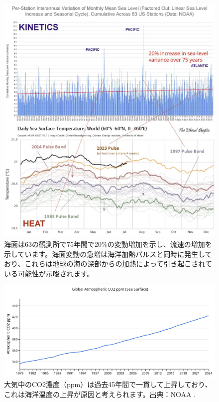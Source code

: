 \documentclass[10pt,twocolumn,letterpaper]{article}
\begin{document}
\begin{figure}[t]
\begin{center}
\includegraphics[width=1\textwidth]{sealevel.jpeg}
\end{center}
   \caption{海面は63の観測所で75年間で20\%の変動増加を示し、流速の増加を示しています。海面変動の急増は海洋加熱パルスと同時に発生しており、これらは地球の海の深部からの加熱によって引き起こされている可能性が示唆されます\cite{2,129}。}
\label{fig:22}
\end{figure}
\begin{figure}[t]
\begin{center}
\includegraphics[width=1\textwidth]{co2.jpg}
\end{center}
   \caption{大気中のCO2濃度（ppm）は過去45年間で一貫して上昇しており、これは海洋温度の上昇が原因と考えられます。出典：NOAA \cite{148,129}.}
\label{fig:23}
\end{figure}
\end{document}
